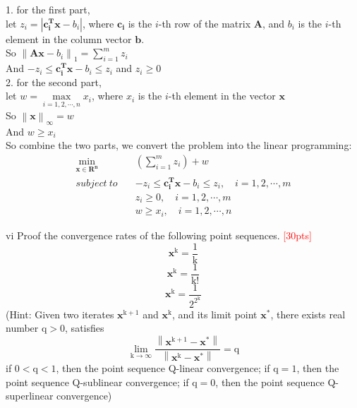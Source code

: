     1. for the first part,\\
    let $z_i = |\mathbf{c_i^Tx}-b_i|$, where $\mathbf{c_i}$ is the $i$-th row of the matrix $\mathbf{A}$, and $b_i$ is the $i$-th element in the column vector $\mathbf{b}$.\\
    So $\left\|\mathbf{Ax}-b_i\right\|_1=\sum\limits_{i=1}^m z_i$\\
    And $-z_i \leq \mathbf{c_i^Tx}-b_i \leq z_i$ and $z_i \geq 0$\\

    2. for the second part,\\
    let $w = \max\limits_{i=1,2,\cdots,n}x_i$, where $x_i$ is the $i$-th element in the vector $\mathbf{x}$\\
    So $\left\|\mathbf{x}\right\|_\infty=w$\\
    And $w \geq x_i$\\
    
    So combine the two parts, we convert the problem into the linear programming:\\
    \begin{equation*}
        \begin{aligned}
            \min_{\mathbf{x}\in\mathbf{R^{n}}}\quad & (\sum\limits_{i=1}^m z_i) + w\\
            subject\ to \quad & -z_i \leq \mathbf{c_i^Tx}-b_i \leq z_i, \quad i=1,2,\cdots,m\\
            & z_i \geq 0, \quad i=1,2,\cdots,m\\
            & w \geq x_i, \quad i=1,2,\cdots,n
        \end{aligned}
    \end{equation*}


\newpage
\begin{problem}{vi}
Proof the convergence rates of the following point sequences.
\textcolor{red}{[30pts]}$$\mathbf{x^{\mathrm{k}}}=\frac{\mathrm{1}}{\mathrm{k}}$$$$\mathbf{x^{\mathrm{k}}}=\frac{\mathrm{1}}{\mathrm{k!}}$$$$\mathbf{x^{\mathrm{k}}}=\frac{\mathrm{1}}{\mathrm{2^{2^{k}}}}$$(Hint: Given two iterates $\mathbf{x^{\mathrm{k+1}}}$ and $\mathbf{x^{\mathrm{k}}}$, and its limit point $\mathbf{x^{\mathrm{*}}}$, there exists real number $\mathrm{q > 0}$, satisfies $$\lim_{\mathrm{k\rightarrow\infty}}\frac{\left\|\mathbf{x^{\mathrm{k+1}}}-\mathbf{x^{\mathrm{*}}}\right\|}{\left\|\mathbf{x^{\mathrm{k}}}-\mathbf{x^{\mathrm{*}}}\right\|} = \mathrm{q}$$ if $\mathrm{0<q<1}$, then the point sequence Q-linear convergence; if $\mathrm{q=1}$, then the point sequence Q-sublinear convergence; if $\mathrm{q=0}$, then the point sequence Q-superlinear convergence)
\end{problem}

